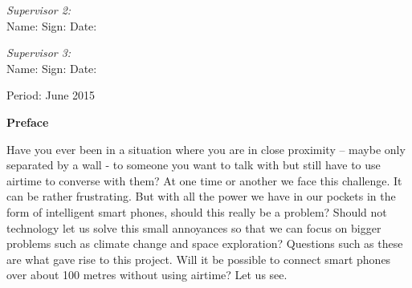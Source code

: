 \documentclass[12pt,svgnames,smaller]{article} %
\begin{document}
\begin{titlepage}
\begin{minipage}{1.0\textwidth}
	\begin{flushleft} \large
		\emph{Supervisor 2:} \\
		Name: \hrulefill Sign: \hrulefill Date: \hrulefill
	\end{flushleft}
\end{minipage}

\begin{minipage}{1.0\textwidth}
	\begin{flushleft} \large
		\emph{Supervisor 3:} \\
		Name: \hrulefill Sign: \hrulefill Date: \hrulefill
	\end{flushleft}
\end{minipage}

\vfill


\begin{center}
	{\large Period: June 2015}
\end{center}
\end{titlepage}



\textbf{Preface}

Have you ever been in a situation where you are in close proximity – maybe only separated by a wall - to someone you want to talk with but still have to use airtime to converse with them? At one time or another we face this challenge. It can be rather frustrating. But with all the power we have in our pockets in the form of intelligent smart phones, should this really be a problem? Should not technology let us solve this small annoyances so that we can focus on bigger problems such as climate change and space exploration? Questions such as these are what gave rise to this project. Will it be possible to connect smart phones over about 100 metres without using airtime? Let us see.


\clearpage

\end{document}
